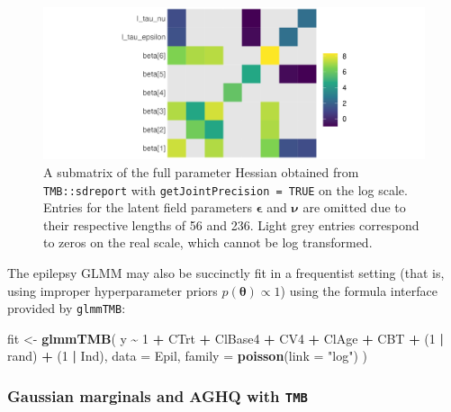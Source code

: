\documentclass[a4paper, nobind]{templates/ociamthesis}
\newenvironment{Shaded}{\begin{snugshade}}{\end{snugshade}}
\newcommand{\AttributeTok}[1]{\textcolor[rgb]{0.13,0.29,0.53}{#1}}
\newcommand{\DecValTok}[1]{\textcolor[rgb]{0.00,0.00,0.81}{#1}}
\newcommand{\FunctionTok}[1]{\textcolor[rgb]{0.13,0.29,0.53}{\textbf{#1}}}
\newcommand{\NormalTok}[1]{#1}
\newcommand{\OtherTok}[1]{\textcolor[rgb]{0.56,0.35,0.01}{#1}}
\newcommand{\SpecialCharTok}[1]{\textcolor[rgb]{0.81,0.36,0.00}{\textbf{#1}}}
\newcommand{\StringTok}[1]{\textcolor[rgb]{0.31,0.60,0.02}{#1}}
\renewenvironment{Shaded}
{
  \vspace{10pt}%
  \begin{snugshade}%
}{%
  \end{snugshade}%
  \vspace{8pt}%
}
\begin{document}
\begin{figure}
\includegraphics[width=0.95\linewidth]{figures/naomi-aghq/hessian-matrix} \caption{A submatrix of the full parameter Hessian obtained from \texttt{TMB::sdreport} with \texttt{getJointPrecision\ =\ TRUE} on the log scale. Entries for the latent field parameters \(\boldsymbol{\mathbf{\epsilon}}\) and \(\boldsymbol{\mathbf{\nu}}\) are omitted due to their respective lengths of 56 and 236. Light grey entries correspond to zeros on the real scale, which cannot be log transformed.}\label{fig:hessian-matrix}
\end{figure}

The epilepsy GLMM may also be succinctly fit in a frequentist setting (that is, using improper hyperparameter priors \(p(\boldsymbol{\mathbf{\theta}}) \propto 1\)) using the formula interface provided by \texttt{glmmTMB}:

\begin{Shaded}
\begin{Highlighting}[]
\NormalTok{fit }\OtherTok{\textless{}{-}} \FunctionTok{glmmTMB}\NormalTok{(}
\NormalTok{  y }\SpecialCharTok{\textasciitilde{}} \DecValTok{1} \SpecialCharTok{+}\NormalTok{ CTrt }\SpecialCharTok{+}\NormalTok{ ClBase4 }\SpecialCharTok{+}\NormalTok{ CV4 }\SpecialCharTok{+}\NormalTok{ ClAge }\SpecialCharTok{+}\NormalTok{ CBT }\SpecialCharTok{+}\NormalTok{ (}\DecValTok{1} \SpecialCharTok{|}\NormalTok{ rand) }\SpecialCharTok{+}\NormalTok{ (}\DecValTok{1} \SpecialCharTok{|}\NormalTok{ Ind),}
  \AttributeTok{data =}\NormalTok{ Epil,}
  \AttributeTok{family =} \FunctionTok{poisson}\NormalTok{(}\AttributeTok{link =} \StringTok{"log"}\NormalTok{)}
\NormalTok{)}
\end{Highlighting}
\end{Shaded}

\hypertarget{epil-gauss-aghq-tmb}{%
\subsubsection{\texorpdfstring{Gaussian marginals and AGHQ with \texttt{TMB}}{Gaussian marginals and AGHQ with TMB}}\label{epil-gauss-aghq-tmb}}
\end{document}
